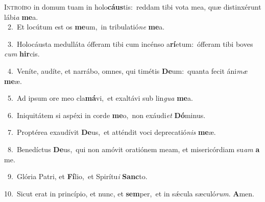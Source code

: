 \lettrine{\initial\textcolor{\initialcolor}{I}}{ntroíbo} in domum tuam in holo\-\textbf{cáus}\-tis:~\star reddam tibi vota mea, quæ distinxérunt lábi\textit{a} \textbf{me}\-a.\\
{\numbfont\textcolor{\numbcolor}{~2.}}~Et locútum est os \textbf{me}\-um,~\star in tribulatió\textit{ne} \textbf{me}\-a.\par
{\numbfont\textcolor{\numbcolor}{~3.}}~Holocáusta medulláta ófferam tibi cum incénso a\-\textbf{rí}\-etum:~\star ófferam tibi boves \textit{cum} \textbf{hir}\-cis.\par
{\numbfont\textcolor{\numbcolor}{~4.}}~Veníte, audíte, et narrábo, omnes, qui timétis \textbf{De}\-um:~\star quanta fecit áni\textit{mæ} \textbf{me}\-æ.\par
{\numbfont\textcolor{\numbcolor}{~5.}}~Ad ipsum ore meo cla\-\textbf{má}\-vi,~\star et exaltávi sub lin\textit{gua} \textbf{me}\-a.\par
{\numbfont\textcolor{\numbcolor}{~6.}}~Iniquitátem si aspéxi in corde \textbf{me}\-o,~\star non exáudi\textit{et} \textbf{Dó}\-minus.\par
{\numbfont\textcolor{\numbcolor}{~7.}}~Proptérea exaudívit \textbf{De}\-us,~\star et atténdit voci deprecatió\textit{nis} \textbf{me}\-æ.\par
{\numbfont\textcolor{\numbcolor}{~8.}}~Benedíctus \textbf{De}\-us,~\star qui non amóvit oratiónem meam, et misericórdiam su\textit{am} \textbf{a} me.\par
{\numbfont\textcolor{\numbcolor}{~9.}}~Glória Patri, et \textbf{Fí}\-lio,~\star et Spirítu\textit{i} \textbf{Sanc}\-to.\par
{\numbfont\textcolor{\numbcolor}{10.}}~Sicut erat in princípio, et nunc, et \textbf{sem}\-per,~\star et in sǽcula sæculó\-\textit{rum}\-. \textbf{A}\-men.\par
